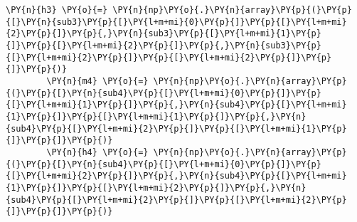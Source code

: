 {\begin{enumerate}
\begin{Verbatim}[commandchars=\\\{\}]
        \PY{n}{h3} \PY{o}{=} \PY{n}{np}\PY{o}{.}\PY{n}{array}\PY{p}{(}\PY{p}{[}\PY{n}{sub3}\PY{p}{[}\PY{l+m+mi}{0}\PY{p}{]}\PY{p}{[}\PY{l+m+mi}{2}\PY{p}{]}\PY{p}{,}\PY{n}{sub3}\PY{p}{[}\PY{l+m+mi}{1}\PY{p}{]}\PY{p}{[}\PY{l+m+mi}{2}\PY{p}{]}\PY{p}{,}\PY{n}{sub3}\PY{p}{[}\PY{l+m+mi}{2}\PY{p}{]}\PY{p}{[}\PY{l+m+mi}{2}\PY{p}{]}\PY{p}{]}\PY{p}{)}
        \PY{n}{m4} \PY{o}{=} \PY{n}{np}\PY{o}{.}\PY{n}{array}\PY{p}{(}\PY{p}{[}\PY{n}{sub4}\PY{p}{[}\PY{l+m+mi}{0}\PY{p}{]}\PY{p}{[}\PY{l+m+mi}{1}\PY{p}{]}\PY{p}{,}\PY{n}{sub4}\PY{p}{[}\PY{l+m+mi}{1}\PY{p}{]}\PY{p}{[}\PY{l+m+mi}{1}\PY{p}{]}\PY{p}{,}\PY{n}{sub4}\PY{p}{[}\PY{l+m+mi}{2}\PY{p}{]}\PY{p}{[}\PY{l+m+mi}{1}\PY{p}{]}\PY{p}{]}\PY{p}{)}
        \PY{n}{h4} \PY{o}{=} \PY{n}{np}\PY{o}{.}\PY{n}{array}\PY{p}{(}\PY{p}{[}\PY{n}{sub4}\PY{p}{[}\PY{l+m+mi}{0}\PY{p}{]}\PY{p}{[}\PY{l+m+mi}{2}\PY{p}{]}\PY{p}{,}\PY{n}{sub4}\PY{p}{[}\PY{l+m+mi}{1}\PY{p}{]}\PY{p}{[}\PY{l+m+mi}{2}\PY{p}{]}\PY{p}{,}\PY{n}{sub4}\PY{p}{[}\PY{l+m+mi}{2}\PY{p}{]}\PY{p}{[}\PY{l+m+mi}{2}\PY{p}{]}\PY{p}{]}\PY{p}{)}
        

\end{Verbatim}
\end{enumerate}}
